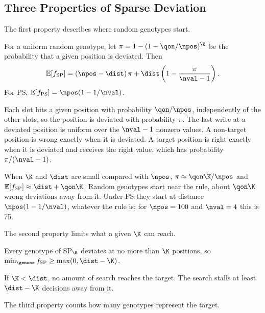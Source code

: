 \subsection{Three Properties of Sparse Deviation}
\label{sec:theory:props}

The first property describes where random genotypes start.

\begin{proposition}
\label{prop:init}
For a uniform random genotype, let $\pi = 1 - (1 - \qon/\npos)^\K$ be the probability that a given position is deviated. Then
\begin{equation}
  \mathbb{E}[f_{\mathrm{SP}}] = (\npos - \dist)\,\pi + \dist \left(1 - \frac{\pi}{\nval-1}\right).
\end{equation}
For PS, $\mathbb{E}[f_{\mathrm{PS}}] = \npos (1 - 1/\nval)$.
\end{proposition}

\begin{IEEEproof}
Each slot hits a given position with probability $\qon/\npos$, independently of the other slots, so the position is deviated with probability $\pi$.
The last write at a deviated position is uniform over the $\nval-1$ nonzero values.
A non-target position is wrong exactly when it is deviated.
A target position is right exactly when it is deviated and receives the right value, which has probability $\pi/(\nval-1)$.
\end{IEEEproof}

When $\K$ and $\dist$ are small compared with $\npos$, $\pi \approx \qon\K/\npos$ and $\mathbb{E}[f_{\mathrm{SP}}] \approx \dist + \qon\K$.
Random genotypes start near the rule, about $\qon\K$ wrong deviations away from it.
Under PS they start at distance $\npos(1-1/\nval)$, whatever the rule is; for $\npos = 100$ and $\nval = 4$ this is 75.

The second property limits what a given $\K$ can reach.

\begin{proposition}
\label{prop:floor}
Every genotype of SP$_\K$ deviates at no more than $\K$ positions, so $\min_{\genome} f_{\mathrm{SP}} \ge \max(0, \dist - \K)$.
\end{proposition}

If $\K < \dist$, no amount of search reaches the target.
The search stalls at least $\dist - \K$ decisions away from it.

The third property counts how many genotypes represent the target.

